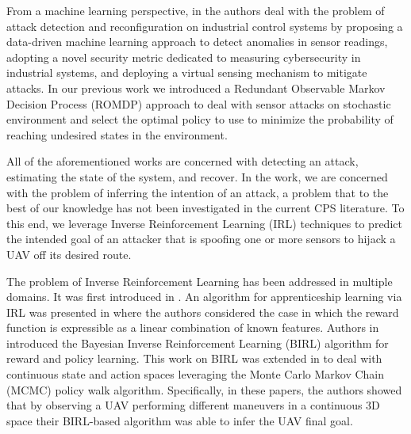 \documentclass[letterpaper, 10 pt, conference]{ieeeconf}  %
\newcommand\NB[1]{$\spadesuit$\footnote{NB: #1}}
\begin{document}
From a machine learning perspective, in \cite{paridari2017framework} the authors deal with the problem of attack detection and reconfiguration on industrial control systems by proposing a data-driven machine learning approach to detect anomalies in sensor readings,  adopting a novel security metric dedicated to measuring cybersecurity in industrial systems, and deploying a virtual sensing mechanism to mitigate attacks. 
In our previous work \cite{bezzo2016stochastic} we introduced a Redundant Observable Markov Decision Process (ROMDP) approach to deal with sensor attacks on stochastic environment and select the optimal policy to use to minimize the probability of reaching undesired states in the environment. 

All of the aforementioned works are concerned with detecting an attack, estimating the state of the system, and recover. In the work, we are concerned with the problem of inferring the intention of an attack, a problem that to the best of our knowledge has not been investigated in the current CPS literature.
To this end, we leverage Inverse Reinforcement Learning (IRL) techniques to predict the intended goal of an attacker that is spoofing one or more sensors to hijack a UAV off its desired route.
%

The problem of Inverse Reinforcement Learning has been addressed in multiple domains. It was first introduced in \cite{ng2000algorithms}. An algorithm for apprenticeship learning via IRL was presented in \cite{abbeel2004apprenticeship} where the authors considered the case in which the reward function is expressible as a linear combination of known features. 
Authors in \cite{ramachandran2007bayesian} introduced the Bayesian Inverse Reinforcement Learning (BIRL) algorithm for reward and policy learning. This work on BIRL was extended in \cite{michini2015bayesian,michini2013scalable,michini2012improving} to deal with continuous state and action spaces leveraging the Monte Carlo Markov Chain (MCMC) policy walk algorithm. Specifically, in these papers, the authors showed that by observing a UAV performing different maneuvers in a continuous 3D space their BIRL-based algorithm was able to infer the UAV final goal. 
\end{document}
